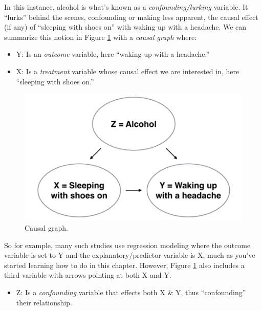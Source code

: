\documentclass[12pt,]{krantz}
\providecommand{\tightlist}{%
  \setlength{\itemsep}{0pt}\setlength{\parskip}{0pt}}
\begin{document}
In this instance, alcohol is what's known as a
\emph{confounding/lurking} variable. It ``lurks'' behind the scenes,
confounding or making less apparent, the causal effect (if any) of
``sleeping with shoes on'' with waking up with a headache. We can
summarize this notion in Figure \ref{fig:moderndive-figure-causal-graph}
with a \emph{causal graph} where:

\begin{itemize}
\tightlist
\item
  Y: Is an \emph{outcome} variable, here ``waking up with a headache.''
\item
  X: Is a \emph{treatment} variable whose causal effect we are
  interested in, here ``sleeping with shoes on.''
\end{itemize}

\begin{figure}

{\centering \includegraphics[width=\textwidth]{images/flowcharts/flowchart.009-cropped} 

}

\caption{Causal graph.}\label{fig:moderndive-figure-causal-graph}
\end{figure}

So for example, many such studies use regression modeling where the
outcome variable is set to Y and the explanatory/predictor variable is
X, much as you've started learning how to do in this chapter. However,
Figure \ref{fig:moderndive-figure-causal-graph} also includes a third
variable with arrows pointing at both X and Y.

\begin{itemize}
\tightlist
\item
  Z: Is a \emph{confounding} variable that effects both X \& Y, thus
  ``confounding'' their relationship.
\end{itemize}
\end{document}
